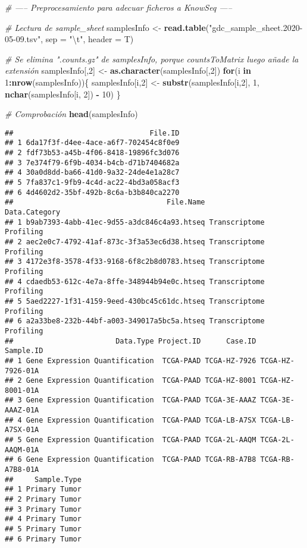 \documentclass[
]{article}
\newenvironment{Shaded}{\begin{snugshade}}{\end{snugshade}}
\newcommand{\CharTok}[1]{\textcolor[rgb]{0.31,0.60,0.02}{#1}}
\newcommand{\CommentTok}[1]{\textcolor[rgb]{0.56,0.35,0.01}{\textit{#1}}}
\newcommand{\ControlFlowTok}[1]{\textcolor[rgb]{0.13,0.29,0.53}{\textbf{#1}}}
\newcommand{\DataTypeTok}[1]{\textcolor[rgb]{0.13,0.29,0.53}{#1}}
\newcommand{\DecValTok}[1]{\textcolor[rgb]{0.00,0.00,0.81}{#1}}
\newcommand{\KeywordTok}[1]{\textcolor[rgb]{0.13,0.29,0.53}{\textbf{#1}}}
\newcommand{\NormalTok}[1]{#1}
\newcommand{\OperatorTok}[1]{\textcolor[rgb]{0.81,0.36,0.00}{\textbf{#1}}}
\newcommand{\StringTok}[1]{\textcolor[rgb]{0.31,0.60,0.02}{#1}}
\begin{document}
\begin{Shaded}
\begin{Highlighting}[]
\CommentTok{# ----- Preprocesamiento para adecuar ficheros a KnowSeq -----}

\CommentTok{# Lectura de sample_sheet}
\NormalTok{samplesInfo <-}\StringTok{ }\KeywordTok{read.table}\NormalTok{(}\StringTok{"gdc_sample_sheet.2020-05-09.tsv"}\NormalTok{, }\DataTypeTok{sep =} \StringTok{"}\CharTok{\textbackslash{}t}\StringTok{"}\NormalTok{, }\DataTypeTok{header =}\NormalTok{ T)}

\CommentTok{# Se elimina ".counts.gz" de samplesInfo, porque countsToMatrix luego añade la extensión}
\NormalTok{samplesInfo[,}\DecValTok{2}\NormalTok{] <-}\StringTok{ }\KeywordTok{as.character}\NormalTok{(samplesInfo[,}\DecValTok{2}\NormalTok{])}
\ControlFlowTok{for}\NormalTok{(i }\ControlFlowTok{in} \DecValTok{1}\OperatorTok{:}\KeywordTok{nrow}\NormalTok{(samplesInfo))\{}
\NormalTok{  samplesInfo[i,}\DecValTok{2}\NormalTok{] <-}\StringTok{ }\KeywordTok{substr}\NormalTok{(samplesInfo[i,}\DecValTok{2}\NormalTok{], }\DecValTok{1}\NormalTok{, }\KeywordTok{nchar}\NormalTok{(samplesInfo[i, }\DecValTok{2}\NormalTok{]) }\OperatorTok{-}\StringTok{ }\DecValTok{10}\NormalTok{)}
\NormalTok{\}}

\CommentTok{# Comprobación }
\KeywordTok{head}\NormalTok{(samplesInfo)}
\end{Highlighting}
\end{Shaded}

\begin{verbatim}
##                                File.ID
## 1 6da17f3f-d4ee-4ace-a6f7-702454c8f0e9
## 2 fdf73b53-a45b-4f06-8418-19896fc3d076
## 3 7e374f79-6f9b-4034-b4cb-d71b7404682a
## 4 30a0d8dd-ba66-41d0-9a32-24de4e1a28c7
## 5 7fa837c1-9fb9-4c4d-ac22-4bd3a058acf3
## 6 4d4602d2-35bf-492b-8c6a-b3b840ca2270
##                                    File.Name           Data.Category
## 1 b9ab7393-4abb-41ec-9d55-a3dc846c4a93.htseq Transcriptome Profiling
## 2 aec2e0c7-4792-41af-873c-3f3a53ec6d38.htseq Transcriptome Profiling
## 3 4172e3f8-3578-4f33-9168-6f8c2b8d0783.htseq Transcriptome Profiling
## 4 cdaedb53-612c-4e7a-8ffe-348944b94e0c.htseq Transcriptome Profiling
## 5 5aed2227-1f31-4159-9eed-430bc45c61dc.htseq Transcriptome Profiling
## 6 a2a33be8-232b-44bf-a003-349017a5bc5a.htseq Transcriptome Profiling
##                        Data.Type Project.ID      Case.ID        Sample.ID
## 1 Gene Expression Quantification  TCGA-PAAD TCGA-HZ-7926 TCGA-HZ-7926-01A
## 2 Gene Expression Quantification  TCGA-PAAD TCGA-HZ-8001 TCGA-HZ-8001-01A
## 3 Gene Expression Quantification  TCGA-PAAD TCGA-3E-AAAZ TCGA-3E-AAAZ-01A
## 4 Gene Expression Quantification  TCGA-PAAD TCGA-LB-A7SX TCGA-LB-A7SX-01A
## 5 Gene Expression Quantification  TCGA-PAAD TCGA-2L-AAQM TCGA-2L-AAQM-01A
## 6 Gene Expression Quantification  TCGA-PAAD TCGA-RB-A7B8 TCGA-RB-A7B8-01A
##     Sample.Type
## 1 Primary Tumor
## 2 Primary Tumor
## 3 Primary Tumor
## 4 Primary Tumor
## 5 Primary Tumor
## 6 Primary Tumor
\end{verbatim}
\end{document}
